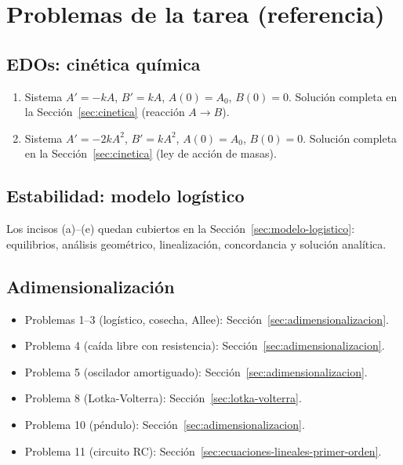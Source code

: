 \documentclass[11pt,letterpaper]{article}
\begin{document}
\section{Problemas de la tarea (referencia)}
\label{sec:tarea-referencia}

\subsection{EDOs: cinética química}

\begin{enumerate}
\item Sistema $A'=-kA$, $B'=kA$, $A(0)=A_0$, $B(0)=0$.
      Solución completa en la Sección~\ref{sec:cinetica} (reacción $A\to B$).
\item Sistema $A'=-2kA^2$, $B'=kA^2$, $A(0)=A_0$, $B(0)=0$.
      Solución completa en la Sección~\ref{sec:cinetica} (ley de acción de masas).
\end{enumerate}

\subsection{Estabilidad: modelo logístico}

Los incisos (a)--(e) quedan cubiertos en la Sección~\ref{sec:modelo-logistico}:
equilibrios, análisis geométrico, linealización, concordancia y solución analítica.

\subsection{Adimensionalización}

\begin{itemize}
    \item Problemas 1--3 (logístico, cosecha, Allee): Sección~\ref{sec:adimensionalizacion}.
    \item Problema 4 (caída libre con resistencia): Sección~\ref{sec:adimensionalizacion}.
    \item Problema 5 (oscilador amortiguado): Sección~\ref{sec:adimensionalizacion}.
    \item Problema 8 (Lotka-Volterra): Sección~\ref{sec:lotka-volterra}.
    \item Problema 10 (péndulo): Sección~\ref{sec:adimensionalizacion}.
    \item Problema 11 (circuito RC): Sección~\ref{sec:ecuaciones-lineales-primer-orden}.
\end{itemize}
\end{document}
